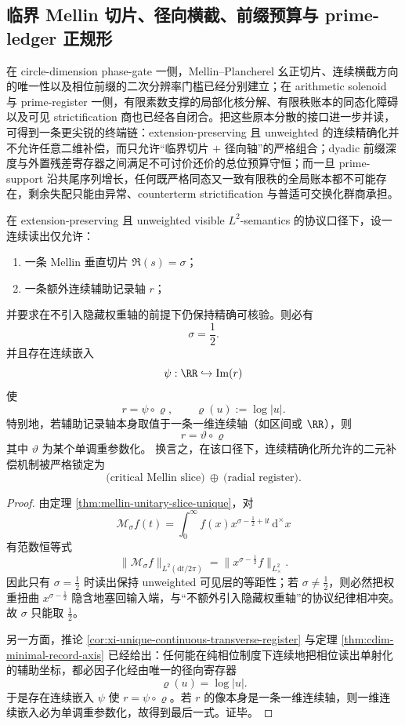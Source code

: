 \subsection{临界 Mellin 切片、径向横截、前缀预算与 prime-ledger 正规形}\label{subsec:conclusion-criticalslice-radial-prefix-prime-ledger-normalform}
在 circle-dimension phase-gate 一侧，Mellin--Plancherel 幺正切片、连续横截方向的唯一性以及相位前缀的二次分辨率门槛已经分别建立；在 arithmetic solenoid 与 prime-register 一侧，有限素数支撑的局部化核分解、有限秩账本的同态化障碍以及可见 strictification 商也已经各自闭合。把这些原本分散的接口进一步并读，可得到一条更尖锐的终端链：extension-preserving 且 unweighted 的连续精确化并不允许任意二维补偿，而只允许“临界切片 \(+\) 径向轴”的严格组合；dyadic 前缀深度与外置残差寄存器之间满足不可讨价还价的总位预算守恒；而一旦 prime-support 沿共尾序列增长，任何既严格同态又一致有限秩的全局账本都不可能存在，剩余失配只能由异常、counterterm strictification 与普适可交换化群商承担。

\begin{theorem}[临界切片与径向轴的双刚性]\label{thm:conclusion-critical-mellin-radial-double-rigidity}
在 extension-preserving 且 unweighted visible \(L^2\)-semantics 的协议口径下，设一连续读出仅允许：
\begin{enumerate}
  \item 一条 Mellin 垂直切片 \(\Re(s)=\sigma\)；
  \item 一条额外连续辅助记录轴 \(r\)；
\end{enumerate}
并要求在不引入隐藏权重轴的前提下仍保持精确可核验。则必有
\[
\sigma=\frac12.
\]
并且存在连续嵌入
\[
\psi:\RR\hookrightarrow \operatorname{Im}(r)
\]
使
\[
r=\psi\circ \varrho,
\qquad
\varrho(u):=\log|u|.
\]
特别地，若辅助记录轴本身取值于一条一维连续轴（如区间或 \(\RR\)），则
\[
r=\vartheta\circ \varrho
\]
其中 \(\vartheta\) 为某个单调重参数化。
换言之，在该口径下，连续精确化所允许的二元补偿机制被严格锁定为
\[
\bigl(\text{critical Mellin slice}\bigr)\ \oplus\ \bigl(\text{radial register}\bigr).
\]
\end{theorem}
\begin{proof}
由定理 \ref{thm:mellin-unitary-slice-unique}，对
\[
\mathcal M_\sigma f(t)=\int_0^\infty f(x)x^{\sigma-\frac12+\mathrm{i}t}\,\mathrm d^\times x
\]
有范数恒等式
\[
\|\mathcal M_\sigma f\|_{L^2(\mathrm dt/2\pi)}
=
\|x^{\sigma-\frac12}f\|_{L^2_\times}.
\]
因此只有 \(\sigma=\frac12\) 时读出保持 unweighted 可见层的等距性；若 \(\sigma\neq \frac12\)，则必然把权重扭曲 \(x^{\sigma-\frac12}\) 隐含地塞回输入端，与“不额外引入隐藏权重轴”的协议纪律相冲突。故 \(\sigma\) 只能取 \(\frac12\)。

另一方面，推论 \ref{cor:xi-unique-continuous-transverse-register} 与定理 \ref{thm:cdim-minimal-record-axis} 已经给出：任何能在纯相位制度下连续地把相位读出单射化的辅助坐标，都必因子化经由唯一的径向寄存器
\[
\varrho(u)=\log|u|.
\]
于是存在连续嵌入 \(\psi\) 使 \(r=\psi\circ\varrho\)。若 \(r\) 的像本身是一条一维连续轴，则一维连续嵌入必为单调重参数化，故得到最后一式。证毕。
\end{proof}

